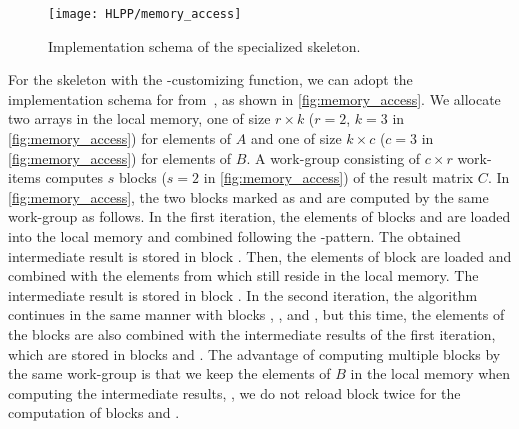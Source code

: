 \begin{figure}[b]
  \centering
  \texttt{[image: HLPP/memory\_access]}
  \caption{Implementation schema of the specialized \allpairs skeleton.}
  \label{fig:memory_access}
\end{figure}
For the \allpairs skeleton with the \zip-\reduce customizing function, we can adopt the implementation schema for \GPUs from~\cite{SarjeAl2013}, as shown in \autoref{fig:memory_access}.
We allocate two arrays in the local memory, one of size $r\times k$ ($r=2$, $k=3$ in \autoref{fig:memory_access}) for elements of $A$ and one of size $k\times c$ ($c=3$ in \autoref{fig:memory_access}) for elements of $B$.
A work-group consisting of $c\times r$ work-items computes $s$ blocks ($s=2$ in \autoref{fig:memory_access}) of the result matrix $C$.
In \autoref{fig:memory_access}, the two blocks marked as  and  are computed by the same work-group as follows.
In the first iteration, the elements of blocks  and  are loaded into the local memory and combined following the \zip-\reduce pattern.
The obtained intermediate result is stored in block .
Then, the elements of block  are loaded and combined with the elements from  which still reside in the local memory.
The intermediate result is stored in block .
In the second iteration, the algorithm continues in the same manner with blocks , , and , but this time, the elements of the blocks are also combined with the intermediate results of the first iteration, which are stored in blocks  and .
The advantage of computing multiple blocks by the same work-group is that we keep the elements of $B$ in the local memory when computing the intermediate results, \ie, we do not reload block  twice for the computation of blocks  and .

